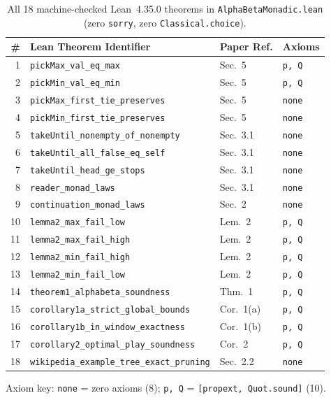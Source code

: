 \documentclass[10pt,twocolumn]{article}
\begin{document}
\begin{table}[t]
\centering
\caption{All 18 machine-checked Lean~4.35.0 theorems in \texttt{AlphaBetaMonadic.lean} (zero \texttt{sorry}, zero \texttt{Classical.choice}).}
\label{tab:lean}
\scriptsize
\setlength{\tabcolsep}{1.5pt}
\begin{tabular}{@{}rlll@{}}
\toprule
\# & Lean Theorem Identifier & Paper Ref. & Axioms \\
\midrule
1 & \texttt{pickMax\_val\_eq\_max} & Sec.~5 & \texttt{p, Q} \\
2 & \texttt{pickMin\_val\_eq\_min} & Sec.~5 & \texttt{p, Q} \\
3 & \texttt{pickMax\_first\_tie\_preserves} & Sec.~5 & \texttt{none} \\
4 & \texttt{pickMin\_first\_tie\_preserves} & Sec.~5 & \texttt{none} \\
5 & \texttt{takeUntil\_nonempty\_of\_nonempty} & Sec.~3.1 & \texttt{none} \\
6 & \texttt{takeUntil\_all\_false\_eq\_self} & Sec.~3.1 & \texttt{none} \\
7 & \texttt{takeUntil\_head\_ge\_stops} & Sec.~3.1 & \texttt{none} \\
8 & \texttt{reader\_monad\_laws} & Sec.~3.1 & \texttt{none} \\
9 & \texttt{continuation\_monad\_laws} & Sec.~2 & \texttt{none} \\
10 & \texttt{lemma2\_max\_fail\_low} & Lem.~2 & \texttt{p, Q} \\
11 & \texttt{lemma2\_max\_fail\_high} & Lem.~2 & \texttt{p, Q} \\
12 & \texttt{lemma2\_min\_fail\_high} & Lem.~2 & \texttt{p, Q} \\
13 & \texttt{lemma2\_min\_fail\_low} & Lem.~2 & \texttt{p, Q} \\
14 & \texttt{theorem1\_alphabeta\_soundness} & Thm.~1 & \texttt{p, Q} \\
15 & \texttt{corollary1a\_strict\_global\_bounds} & Cor.~1(a) & \texttt{p, Q} \\
16 & \texttt{corollary1b\_in\_window\_exactness} & Cor.~1(b) & \texttt{p, Q} \\
17 & \texttt{corollary2\_optimal\_play\_soundness} & Cor.~2 & \texttt{p, Q} \\
18 & \texttt{wikipedia\_example\_tree\_exact\_pruning} & Sec.~2.2 & \texttt{none} \\
\bottomrule
\end{tabular}
\vspace{-0.4em}
\begin{flushleft}
\tiny Axiom key: \texttt{none} = zero axioms (8); \texttt{p, Q} = \texttt{[propext, Quot.sound]} (10).
\end{flushleft}
\vspace{-0.8em}
\end{table}
\end{document}
